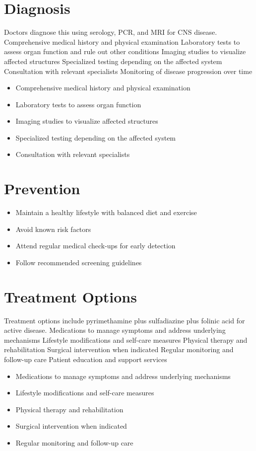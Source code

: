 \section{Diagnosis}
Doctors diagnose this using serology, PCR, and MRI for CNS disease. Comprehensive medical history and physical examination Laboratory tests to assess organ function and rule out other conditions Imaging studies to visualize affected structures Specialized testing depending on the affected system Consultation with relevant specialists Monitoring of disease progression over time

\begin{itemize}[noitemsep]
  \item Comprehensive medical history and physical examination
  \item Laboratory tests to assess organ function
  \item Imaging studies to visualize affected structures
  \item Specialized testing depending on the affected system
  \item Consultation with relevant specialists
\end{itemize}
\section{Prevention}
\begin{itemize}[noitemsep]
  \item Maintain a healthy lifestyle with balanced diet and exercise
  \item Avoid known risk factors
  \item Attend regular medical check-ups for early detection
  \item Follow recommended screening guidelines
\end{itemize}
\section{Treatment Options}
Treatment options include pyrimethamine plus sulfadiazine plus folinic acid for active disease. Medications to manage symptoms and address underlying mechanisms Lifestyle modifications and self-care measures Physical therapy and rehabilitation Surgical intervention when indicated Regular monitoring and follow-up care Patient education and support services

\begin{itemize}[noitemsep]
  \item Medications to manage symptoms and address underlying mechanisms
  \item Lifestyle modifications and self-care measures
  \item Physical therapy and rehabilitation
  \item Surgical intervention when indicated
  \item Regular monitoring and follow-up care
\end{itemize}
